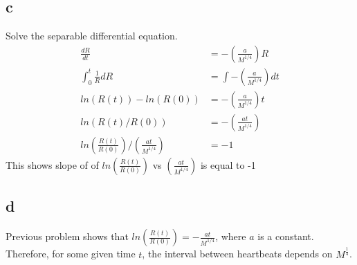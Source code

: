 \documentclass[11pt,letterpaper]{article}
\begin{document}
\subsection*{c}
\noindent Solve the separable differential equation.
\begin{align*}
\frac{dR}{dt} &= - (\frac{a}{M^{1/4}}) R \\
\int_0^t \frac{1}{R} dR &= \int - (\frac{a}{M^{1/4}}) dt \\
ln(R(t)) - ln(R(0)) &= - (\frac{a}{M^{1/4}}) t \\
ln(R(t) / R(0)) &= - (\frac{at}{M^{1/4}}) \\
ln(\frac{  R(t)} {R(0)}) / (\frac{at}{M^{1/4}}) &= -1
\end{align*}
\noindent This shows slope of of $ln(\frac{  R(t)} {R(0)})$ vs $(\frac{at}{M^{1/4}})$ is equal to -1


\subsection*{d}
\noindent Previous problem shows that $ln(\frac{R(t)}{R(0)}) = - \frac{at}{M^{1/4}}$, where $a$ is a constant. Therefore, for some given time $t$, the interval between heartbeats depends on $M^{\frac{1}{4}}$.
\end{document}

